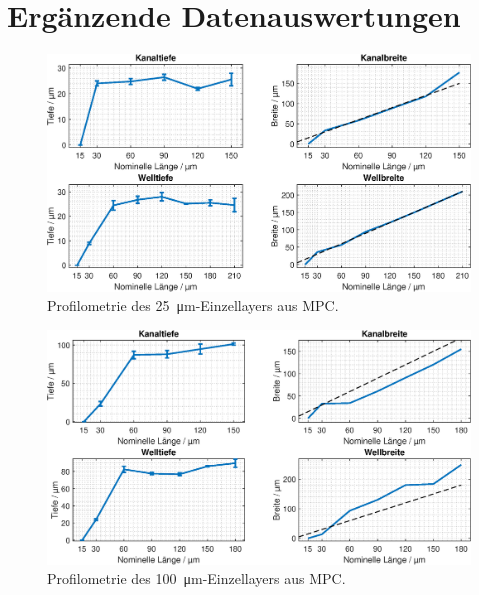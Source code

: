 \section{Ergänzende Datenauswertungen}
\label{appendix}

\begin{figure}[!htb]
    \centering
    \includegraphics[width=\linewidth]{plot/25um_SL_ResolutionV1.eps}
    \caption{Profilometrie des \SI{25}{\micro\meter}-Einzellayers aus MPC.}
    \label{fig:MPC_25um}
\end{figure}


\begin{figure}[!htb]
    \centering
    \includegraphics[width=\linewidth]{plot/100um_SL_ResolutionV1.eps}
    \caption{Profilometrie des \SI{100}{\micro\meter}-Einzellayers aus MPC.}
    \label{fig:MPC_100um}
\end{figure}


